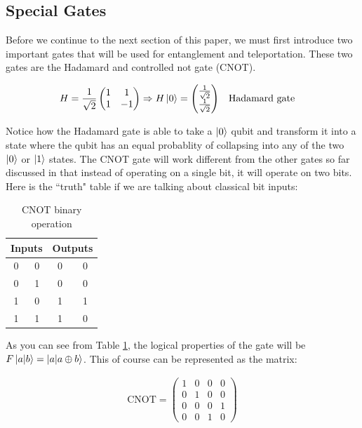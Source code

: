 \documentclass[conference]{IEEEtran}
\begin{document}
\subsection{Special Gates}

Before we continue to the next section of this paper, we must first introduce two important gates that will be used for entanglement and teleportation. These two gates are the Hadamard and controlled not gate (CNOT).

\begin{align*}
H = \frac{1}{\sqrt{2}}\begin{pmatrix}
	1 & 1\\
	1 & -1
\end{pmatrix} \Rightarrow H \ket{0} &= \begin{pmatrix}
	\frac{1}{\sqrt{2}}\\
	\frac{1}{\sqrt{2}}
\end{pmatrix} && \text{Hadamard gate}
\end{align*}

Notice how the Hadamard gate is able to take a $\ket{0}$ qubit and transform it into a state where the qubit has an equal probablity of collapsing into any of the two $\ket{0}$ or $\ket{1}$ states. The CNOT gate will work different from the other gates so far discussed in that instead of operating on a single bit, it will operate on two bits. Here is the ``truth" table if we are talking about classical bit inputs:

\begin{table}[htbp]
\caption{CNOT binary operation}
\begin{center}
\begin{tabular}{|c|c||c|c|}
\hline
\multicolumn{2}{|c||}{\textbf{Inputs}} & \multicolumn{2}{c|}{\textbf{Outputs}}\\\hline
0 & 0 & 0 & 0 \\\hline
0 & 1 & 0 & 0 \\\hline
1 & 0 & 1 & 1 \\\hline
1 & 1 & 1 & 0 \\\hline
\end{tabular}
\label{tab:cnot}
\end{center}
\end{table}

As you can see from Table \ref{tab:cnot}, the logical properties of the gate will be $F\ket{a|b} = \ket{a|a \oplus b}$. This of course can be represented as the matrix:

\begin{align*}
\text{CNOT} = \begin{pmatrix}
	1 & 0 & 0 & 0\\
	0 & 1 & 0 & 0\\
	0 & 0 & 0 & 1\\
	0 & 0 & 1 & 0
\end{pmatrix}
\end{align*}
\end{document}
